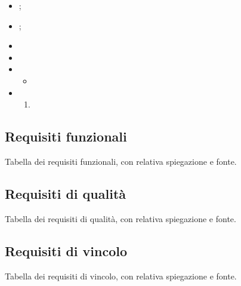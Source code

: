 \label{UC:extension.nft-not-exists}

\begin{itemize}
  \item {};
  \item {};
  \item \UCPre{}
  \item \UCPost{}
  
  \item \UCMain
  \begin{itemize}
    \item 
  \end{itemize}
  
  \item \UCExt
  \begin{enumerate}[label=\lett]
    \item 
  \end{enumerate}
\end{itemize}

\subsection{Requisiti funzionali}
Tabella dei requisiti funzionali, con relativa spiegazione e fonte.

\subsection{Requisiti di qualità}
Tabella dei requisiti di qualità, con relativa spiegazione e fonte.

\subsection{Requisiti di vincolo}
Tabella dei requisiti di vincolo, con relativa spiegazione e fonte.